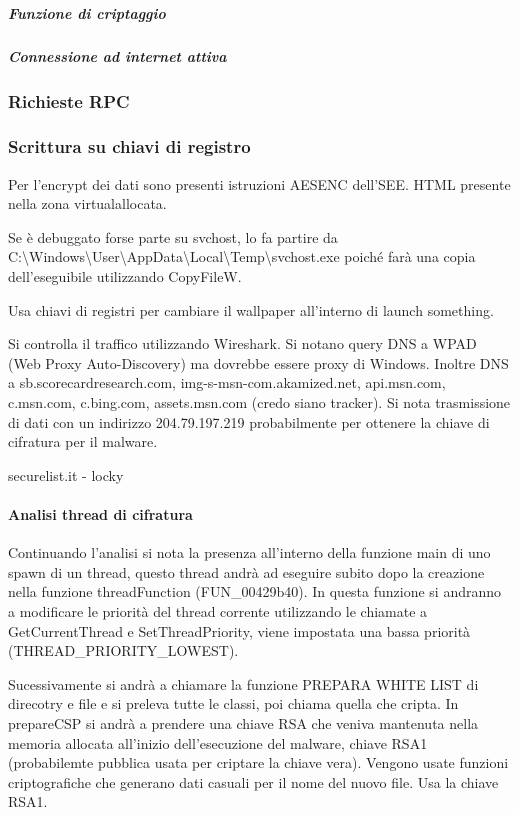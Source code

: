 \documentclass[]{article}
\begin{document}
\subparagraph{Funzione di criptaggio}

\subparagraph{Connessione ad internet attiva}

\subsubsection{Richieste RPC}

\subsubsection{Scrittura su chiavi di registro}





Per l'encrypt dei dati sono presenti istruzioni AESENC dell'SEE. HTML presente nella zona virtualallocata.

Se è debuggato forse parte su svchost, lo fa partire da C:\textbackslash Windows\textbackslash User\textbackslash AppData\textbackslash Local\textbackslash Temp\textbackslash svchost.exe poiché farà una copia dell'eseguibile utilizzando CopyFileW.

Usa chiavi di registri per cambiare il wallpaper all'interno di launch something. 

Si controlla il traffico utilizzando Wireshark. Si notano query DNS a WPAD (Web Proxy Auto-Discovery) ma dovrebbe essere proxy di Windows. Inoltre DNS a sb.scorecardresearch.com, img-s-msn-com.akamized.net, api.msn.com, c.msn.com, c.bing.com, assets.msn.com (credo siano tracker). Si nota trasmissione di dati con un indirizzo 204.79.197.219 probabilmente per ottenere la chiave di cifratura per il malware. 

securelist.it - locky


\paragraph{Analisi thread di cifratura}
Continuando l'analisi si nota la presenza all'interno della funzione main di uno spawn di un thread, questo thread andrà ad eseguire subito dopo la creazione nella funzione threadFunction (FUN\_00429b40).  In questa funzione si andranno a modificare le priorità del thread corrente utilizzando le chiamate a GetCurrentThread e SetThreadPriority, viene impostata una bassa priorità (THREAD\_PRIORITY\_LOWEST).

Sucessivamente si andrà a chiamare la funzione 
PREPARA WHITE LIST di direcotry e file e si preleva tutte le classi, poi chiama quella che cripta. In prepareCSP si andrà a prendere una chiave RSA che veniva mantenuta nella memoria allocata all'inizio dell'esecuzione del malware, chiave RSA1 (probabilemte pubblica usata per criptare la chiave vera). Vengono usate funzioni criptografiche che generano dati casuali per il nome del nuovo file. Usa la chiave RSA1. 
\end{document}
